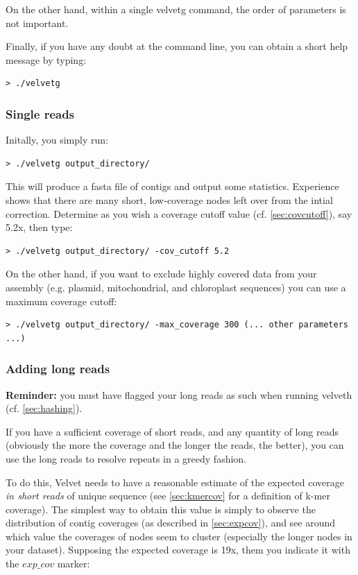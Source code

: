 \documentclass{article}
\begin{document}
On the other hand, within a single velvetg command, the order of parameters is not important.

Finally, if you have any doubt at the command line, you can obtain a short help message by typing:

\begin{verbatim}
> ./velvetg
\end{verbatim}

	\subsubsection{Single reads}
	
	\label{sec:velvetg}

Initally, you simply run: 
\begin{verbatim}
> ./velvetg output_directory/
\end{verbatim}

This will produce a fasta file of contigs and output some statistics.
Experience shows that there are many short, low-coverage nodes left over from the intial correction. Determine as you wish a coverage cutoff value (cf. \ref{sec:covcutoff}), say 5.2x, then type:

\begin{verbatim}
> ./velvetg output_directory/ -cov_cutoff 5.2
\end{verbatim}

On the other hand, if you want to exclude highly covered data from your assembly (e.g. plasmid, mitochondrial, and chloroplast sequences) you can use a maximum coverage cutoff:

\begin{verbatim}
> ./velvetg output_directory/ -max_coverage 300 (... other parameters ...)
\end{verbatim}

	\subsubsection{Adding long reads}
	
\textbf{Reminder:} you must have flagged your long reads as such when running
velveth (cf. \ref{sec:hashing}).
	
If you have a sufficient coverage of short reads, and any quantity of long reads (obviously the more the coverage and the longer the reads, the better), you can use the long reads to resolve repeats in a greedy fashion. 

To do this, Velvet needs to have a reasonable estimate of the expected coverage \emph{in short reads} of unique sequence (see \ref{sec:kmercov} for a definition of k-mer coverage). The simplest way to obtain this value is simply to observe the distribution of contig coverages (as described in \ref{sec:expcov}), and see around which value the coverages of nodes seem to cluster (especially the longer nodes in your dataset). Supposing the expected coverage is 19x, them you indicate it with the $exp\_cov$ marker:
\end{document}
